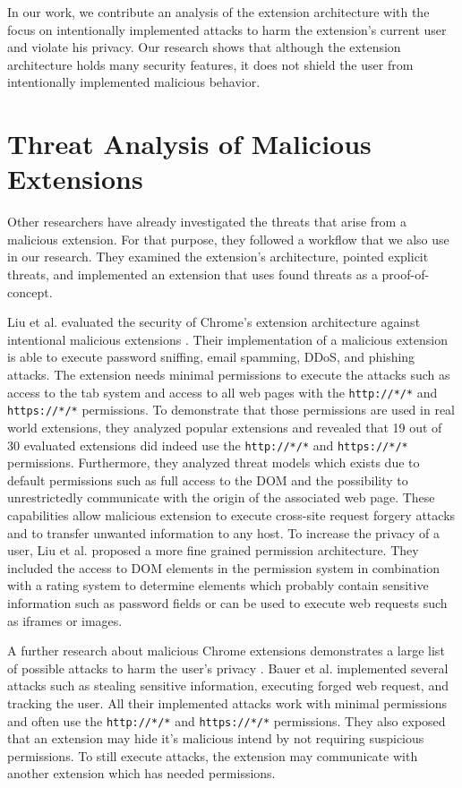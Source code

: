  	In our work, we contribute an analysis of the extension architecture with the focus on intentionally implemented attacks to harm the extension's current user and violate his privacy. Our research shows that although the extension architecture holds many security features, it does not shield the user from intentionally implemented malicious behavior.
 
 \section{Threat Analysis of Malicious Extensions}
 \label{sec:relatedWorks:threatAnalysis}
 
	Other researchers have already investigated the threats that arise from a malicious extension. For that purpose, they followed a workflow that we also use in our research. They examined the extension's architecture, pointed explicit threats, and implemented an extension that uses found threats as a proof-of-concept.
 
	Liu et al. evaluated the security of Chrome's extension architecture against intentional malicious extensions \cite{Liu12chromeextensions:}. Their implementation of a malicious extension is able to execute password sniffing, email spamming, DDoS, and phishing attacks. The extension needs minimal permissions to execute the attacks such as access to the tab system and access to all web pages with the \texttt{http://*/*} and \texttt{https://*/*} permissions. To demonstrate that those permissions are used in real world extensions, they analyzed popular extensions and revealed that 19 out of 30 evaluated extensions did indeed use the \texttt{http://*/*} and \texttt{https://*/*} permissions. Furthermore, they analyzed threat models which exists due to default permissions such as full access to the DOM and the possibility to unrestrictedly communicate with the origin of the associated web page. These capabilities allow malicious extension to execute cross-site request forgery attacks and to transfer unwanted information to any host. To increase the privacy of a user, Liu et al. proposed a more fine grained permission architecture. They included the access to DOM elements in the permission system in combination with a rating system to determine elements which probably contain sensitive information such as password fields or can be used to execute web requests such as iframes or images. 
	 	
	A further research about malicious Chrome extensions demonstrates a large list of possible attacks to harm the user's privacy \cite{extensions:cns14}. Bauer et al. implemented several attacks such as stealing sensitive information, executing forged web request, and tracking the user. All their implemented attacks work with minimal permissions and often use the \texttt{http://*/*} and \texttt{https://*/*} permissions. They also exposed that an extension may hide it's malicious intend by not requiring suspicious permissions. To still execute attacks, the extension may communicate with another extension which has needed permissions.
	 
